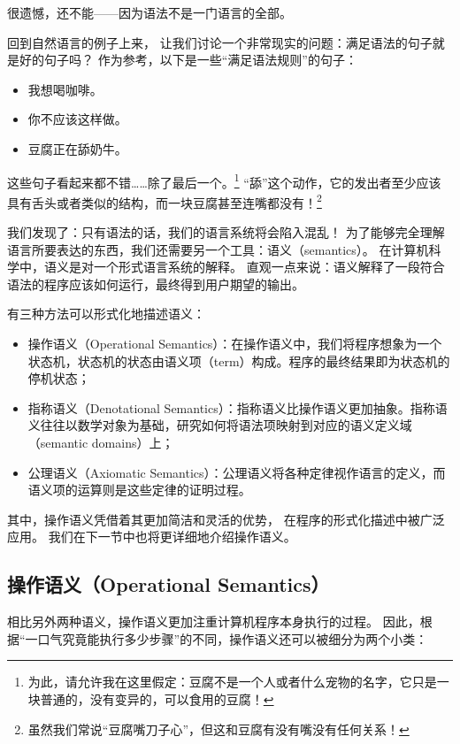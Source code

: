 \documentclass[../main.tex]{subfiles}
\begin{document}
  \indent 很遗憾，还不能——因为语法不是一门语言的全部。

  \indent 回到自然语言的例子上来，
  让我们讨论一个非常现实的问题：满足语法的句子就是好的句子吗？
  作为参考，以下是一些“满足语法规则”的句子：

  \begin{itemize}
    \item 我想喝咖啡。
    \item 你不应该这样做。
    \item 豆腐正在舔奶牛。
  \end{itemize}

  \indent 这些句子看起来都不错……除了最后一个。\footnote[1]{为此，请允许我在这里假定：豆腐不是一个人或者什么宠物的名字，它只是一块普通的，没有变异的，可以食用的豆腐！}
  “舔”这个动作，它的发出者至少应该具有舌头或者类似的结构，而一块豆腐甚至连嘴都没有！\footnote[2]{虽然我们常说“豆腐嘴刀子心”，但这和豆腐有没有嘴没有任何关系！}

  \indent 我们发现了：只有语法的话，我们的语言系统将会陷入混乱！
  为了能够完全理解语言所要表达的东西，我们还需要另一个工具：语义（semantics）。
  在计算机科学中，语义是对一个形式语言系统的解释。\cite{semwiki}
  直观一点来说：语义解释了一段符合语法的程序应该如何运行，最终得到用户期望的输出。

  \indent 有三种方法可以形式化地描述语义：\cite{tapl}

  \begin{itemize}
    \item 操作语义（Operational Semantics）：在操作语义中，我们将程序想象为一个状态机，状态机的状态由语义项（term）构成。程序的最终结果即为状态机的停机状态；
    \item 指称语义（Denotational Semantics）：指称语义比操作语义更加抽象。指称语义往往以数学对象为基础，研究如何将语法项映射到对应的语义定义域（semantic domains）上；
    \item 公理语义（Axiomatic Semantics）：公理语义将各种定律视作语言的定义，而语义项的运算则是这些定律的证明过程。
  \end{itemize}

  \indent 其中，操作语义凭借着其更加简洁和灵活的优势，
  在程序的形式化描述中被广泛应用。\cite{tapl}
  我们在下一节中也将更详细地介绍操作语义。

  \subsection{操作语义（Operational Semantics）}
  \indent 相比另外两种语义，操作语义更加注重计算机程序本身执行的过程。
  因此，根据“一口气究竟能执行多少步骤”的不同，操作语义还可以被细分为两个小类：\cite{opwiki}
\end{document}
